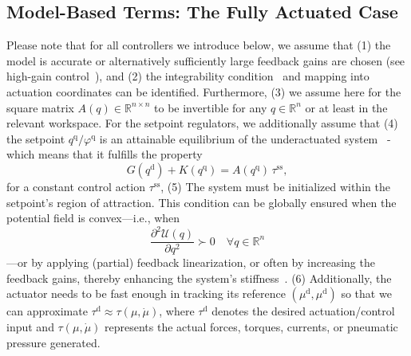 \subsection{Model-Based Terms: The Fully Actuated Case}\label{sub:background:model_based_control:model_based_terms_fully_actuated}
Please note that for all controllers we introduce below, we assume that (1) the model is accurate or alternatively sufficiently large feedback gains are chosen (see high-gain control~\citep{marino1985high}), and (2) the integrability condition~\citep{pustina2024input} and mapping into actuation coordinates can be identified.
Furthermore, (3) we assume here for the square matrix $A(q) \in \mathbb{R}^{n \times n}$ to be invertible for any $q \in \mathbb{R}^n$ or at least in the relevant workspace.
For the setpoint regulators, we additionally assume that (4) the setpoint $q^\mathrm{q}/\varphi^\mathrm{q}$ is an attainable equilibrium of the underactuated system~\citep{pustina2022feedback} - which means that it fulfills the property
\begin{equation}
    G(q^\mathrm{d}) + K(q^\mathrm{q}) = A(q^\mathrm{q}) \, \tau^\mathrm{ss},
\end{equation}
for a constant control action $\tau^\mathrm{ss}$, 
(5) The system must be initialized within the setpoint’s region of attraction. This condition can be globally ensured when the potential field is convex—i.e., when
\begin{equation}
    \frac{\partial^2 \mathcal{U}(q)}{\partial q^2} \succ 0 \quad \forall q \in \mathbb{R}^n
\end{equation}
—or by applying (partial) feedback linearization, or often by increasing the feedback gains, thereby enhancing the system’s stiffness~\citep{della2017controlling, della2023model}. (6) Additionally, the actuator needs to be fast enough in tracking its reference $(\mu^\mathrm{d}, \mu^\mathrm{d})$ so that we can approximate $\tau^\mathrm{d} \approx \tau(\mu,\dot{\mu})$, where $\tau^\mathrm{d}$ denotes the desired actuation/control input and $\tau(\mu,\dot{\mu})$ represents the actual forces, torques, currents, or pneumatic pressure generated.

